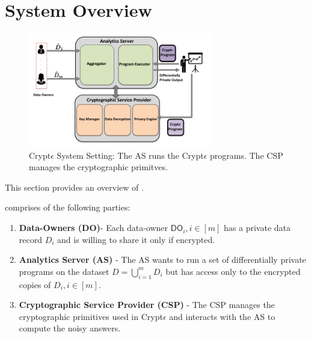 \section{System Overview}

\begin{figure}\includegraphics[height=5cm,width=8cm]{cry.png} \caption{ Crypt$\epsilon$ System Setting: The  \textsf{AS} runs the Crypt$\epsilon$ programs. The \textsf{CSP} manages the cryptographic primitves. } \end{figure}



This section provides an overview of \system.

\system comprises of the following parties:\begin{enumerate}
\item \textbf{Data-Owners (\textsf{DO})}-  Each data-owner $\textsf{DO}_i, i \in [m]$ has  a
private data record $D_i$ and is willing to share it only if encrypted.    \item \textbf{Analytics Server (\textsf{AS})} - The \textsf{AS} wants to run a set of differentially private programs on the dataset $D=\bigcup_{i=1}^m D_i$  but has 
access only to the encrypted copies of $D_i, i \in [m]$.
\item \textbf{Cryptographic Service Provider (\textsf{CSP})} -
 The \textsf{CSP} manages the cryptographic primitives used in Crypt$\epsilon$ and interacts with the \textsf{AS} to compute the
noisy answers.
\end{enumerate}

